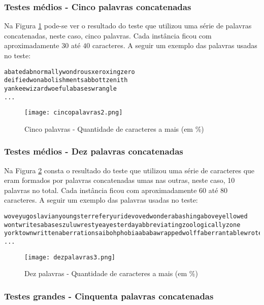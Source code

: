 \documentclass[12pt]{article}
\begin{document}
\subsubsection{Testes médios - Cinco palavras concatenadas}
\label{medio}

Na Figura \ref{cincopalavras} pode-se ver o resultado do teste que utilizou uma série de palavras concatenadas, neste caso, cinco palavras. Cada instância ficou com aproximadamente $30$ até $40$ caracteres. A seguir um exemplo das palavras usadas no teste:

\begin{verbatim}
abatedabnormallywondrousxeroxingzero
deifiedwonabolishmentsabbottzenith
yankeewizardwoefulabaseswrangle
...
\end{verbatim}


    \begin{figure}[h!]
        \centering
        \texttt{[image: cincopalavras2.png]}
        \caption{Cinco palavras - Quantidade de caracteres a mais (em \%)}
        \label{cincopalavras}
    \end{figure}

\subsubsection{Testes médios - Dez palavras concatenadas}
\label{medio10}

Na Figura \ref{dezpalavras} consta o resultado do teste que utilizou uma série de caracteres que eram formados por palavras concatenadas umas nas outras, neste caso, 10 palavras no total. Cada instância ficou com aproximadamente $60$ até $80$ caracteres. A seguir um exemplo das palavras usadas no teste:

\begin{verbatim}
woveyugoslavianyoungsterreferyuridevovedwonderabashingaboveyellowed
wontwritesabaseszuluwrestyeayesterdayabbreviatingzoologicallyzone
yorktownwrittenaberrationsaibohphobiaababawrappedwolffaberrantablewrote
...
\end{verbatim}


    \begin{figure}[h!]
        \centering
        \texttt{[image: dezpalavras3.png]}
        \caption{Dez palavras - Quantidade de caracteres a mais (em \%)}
        \label{dezpalavras}
    \end{figure}


\subsubsection{Testes grandes - Cinquenta palavras concatenadas}
\label{grande50}
\end{document}
